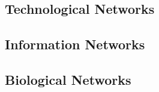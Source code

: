 \subsection{Technological Networks}\label{sec:Technological Networks}
\subsection{Information Networks}\label{sec:Information Networks}
\subsection{Biological Networks}\label{sec:Biological Networks}

